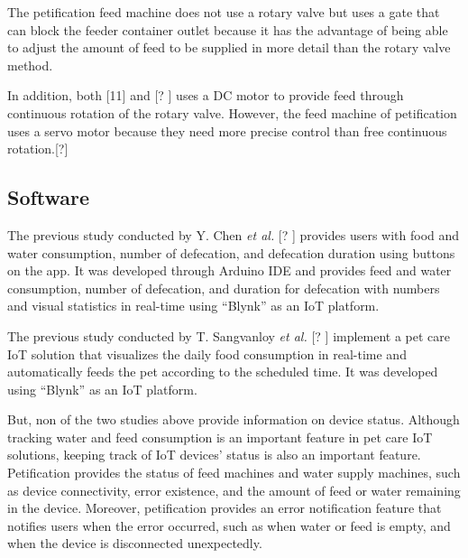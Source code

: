 \documentclass[conference]{IEEEtran}
\begin{document}
The petification feed machine does not use a rotary valve but uses a gate that can block the feeder container outlet because it has the advantage of being able to adjust the amount of feed to be supplied in more detail than the rotary valve method.

In addition, both [11] and [?
] uses a DC motor to provide feed through continuous rotation of the rotary valve. However, the feed machine of petification uses a servo motor because they need more precise control than free continuous rotation.[?] 

\subsection{Software}
  The previous study conducted by Y. Chen \textit{et al.} [?
] 
provides users with food and water consumption, number of defecation, and defecation duration using buttons on the app. It was developed through Arduino IDE and provides feed and water consumption, number of defecation, and duration for defecation with numbers and visual statistics in real-time using “Blynk” as an IoT platform.

The previous study conducted by T. Sangvanloy \textit{et al.} [?
] 
implement a pet care IoT solution that visualizes the daily food consumption in real-time and automatically feeds the pet according to the scheduled time. It was developed using “Blynk” as an IoT platform.

But, non of the two studies above provide information on device status. Although tracking water and feed consumption is an important feature in pet care IoT solutions, keeping track of IoT devices’ status is also an important feature. Petification provides the status of feed machines and water supply machines, such as device connectivity, error existence, and the amount of feed or water remaining in the device. Moreover, petification provides an error notification feature that notifies users when the error occurred, such as when water or feed is empty, and when the device is disconnected unexpectedly.
\end{document}
